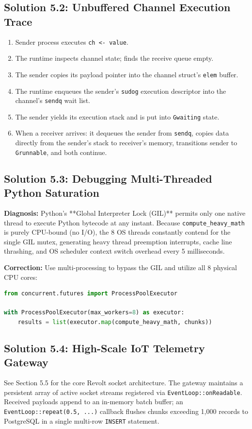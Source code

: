 \subsection{Solution 5.2: Unbuffered Channel Execution Trace}
\begin{enumerate}[leftmargin=15pt]
  \item Sender process executes \texttt{ch <- value}.
  \item The runtime inspects channel state; finds the receive queue empty.
  \item The sender copies its payload pointer into the channel struct's \texttt{elem} buffer.
  \item The runtime enqueues the sender's \texttt{sudog} execution descriptor into the channel's \texttt{sendq} wait list.
  \item The sender yields its execution stack and is put into \texttt{Gwaiting} state.
  \item When a receiver arrives: it dequeues the sender from \texttt{sendq}, copies data directly from the sender's stack to receiver's memory, transitions sender to \texttt{Grunnable}, and both continue.
\end{enumerate}

\subsection{Solution 5.3: Debugging Multi-Threaded Python Saturation}
\textbf{Diagnosis:} Python's **Global Interpreter Lock (GIL)** permits only one native thread to execute Python bytecode at any instant. Because \texttt{compute\_heavy\_math} is purely CPU-bound (no I/O), the 8 OS threads constantly contend for the single GIL mutex, generating heavy thread preemption interrupts, cache line thrashing, and OS scheduler context switch overhead every 5 milliseconds.

\textbf{Correction:} Use multi-processing to bypass the GIL and utilize all 8 physical CPU cores:
\begin{lstlisting}[language=Python]
from concurrent.futures import ProcessPoolExecutor

with ProcessPoolExecutor(max_workers=8) as executor:
    results = list(executor.map(compute_heavy_math, chunks))
\end{lstlisting}

\subsection{Solution 5.4: High-Scale IoT Telemetry Gateway}
See Section 5.5 for the core Revolt socket architecture. The gateway maintains a persistent array of active socket streams registered via \texttt{EventLoop::onReadable}. Received payloads append to an in-memory batch buffer; an \texttt{EventLoop::repeat(0.5, ...)} callback flushes chunks exceeding 1,000 records to PostgreSQL in a single multi-row \texttt{INSERT} statement.

